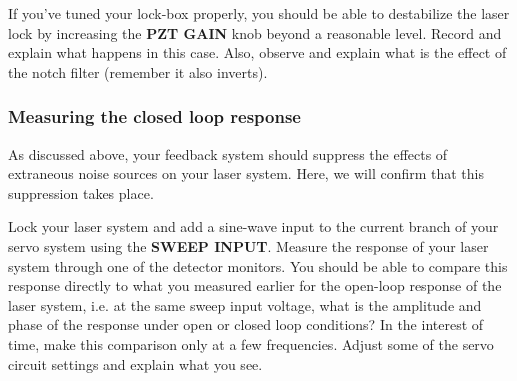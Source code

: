 \documentclass{../lab}
\begin{document}
If you've tuned your lock-box properly, you should be able to destabilize the laser lock by increasing the \textbf{PZT GAIN} knob beyond a reasonable level. Record and explain what happens in this case. Also, observe and explain what is the effect of the notch filter (remember it also inverts).



\subsubsection{Measuring the closed loop response}

As discussed above, your feedback system should suppress the effects of extraneous noise sources on your laser system. Here, we will confirm that this suppression takes place.

Lock your laser system and add a sine-wave input to the current branch of your servo system using the \textbf{SWEEP INPUT}. Measure the response of your laser system through one of the detector monitors. You should be able to compare this response directly to what you measured earlier for the open-loop response of the laser system, i.e. at the same sweep input voltage, what is the amplitude and phase of the response under open or closed loop conditions? In the interest of time, make this comparison only at a few frequencies. Adjust some of the servo circuit settings and explain what you see.
\end{document}
